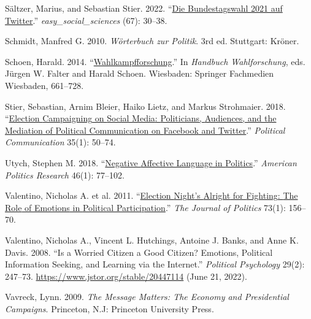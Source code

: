 \documentclass[a4paper,11pt]{article}
\newlength{\cslhangindent}
\newenvironment{CSLReferences}[2] %
 {\setlength{\cslhangindent}{#2\parindent}%
  \setlength{\parindent}{0pt}%
  \everypar{\setlength{\hangindent}{\cslhangindent}}\ignorespaces}
 {\par}
\begin{document}
\begin{CSLReferences}{1}{0}
\leavevmode{}%
Sältzer, Marius, and Sebastian Stier. 2022. {``\href{https://doi.org/10.15464/EASY.2022.05}{{Die Bundestagswahl 2021 auf Twitter}}.''} \emph{easy\_social\_sciences} (67): 30--38.

\leavevmode{}%
Schmidt, Manfred G. 2010. \emph{{Wörterbuch zur Politik}}. 3rd ed. {Stuttgart}: {Kröner}.

\leavevmode{}%
Schoen, Harald. 2014. {``\href{https://doi.org/10.1007/978-3-658-05164-8_16}{Wahlkampfforschung}.''} In \emph{Handbuch {Wahlforschung}}, eds. Jürgen W. Falter and Harald Schoen. {Wiesbaden}: {Springer Fachmedien Wiesbaden}, 661--728.

\leavevmode{}%
Stier, Sebastian, Arnim Bleier, Haiko Lietz, and Markus Strohmaier. 2018. {``\href{https://doi.org/10.1080/10584609.2017.1334728}{Election {Campaigning} on {Social Media}: {Politicians}, {Audiences}, and the {Mediation} of {Political Communication} on {Facebook} and {Twitter}}.''} \emph{Political Communication} 35(1): 50--74.

\leavevmode{}%
Utych, Stephen M. 2018. {``\href{https://doi.org/10.1177/1532673X17693830}{Negative {Affective Language} in {Politics}}.''} \emph{American Politics Research} 46(1): 77--102.

\leavevmode{}%
Valentino, Nicholas A. et al. 2011. {``\href{https://doi.org/10.1017/S0022381610000939}{Election {Night}'s {Alright} for {Fighting}: {The Role} of {Emotions} in {Political Participation}}.''} \emph{The Journal of Politics} 73(1): 156--70.

\leavevmode{}%
Valentino, Nicholas A., Vincent L. Hutchings, Antoine J. Banks, and Anne K. Davis. 2008. {``Is a {Worried Citizen} a {Good Citizen}? {Emotions}, {Political Information Seeking}, and {Learning} via the {Internet}.''} \emph{Political Psychology} 29(2): 247--73. \url{https://www.jstor.org/stable/20447114} (June 21, 2022).

\leavevmode{}%
Vavreck, Lynn. 2009. \emph{The Message Matters: The Economy and Presidential Campaigns}. {Princeton, N.J}: {Princeton University Press}.


\end{CSLReferences}
\end{document}
